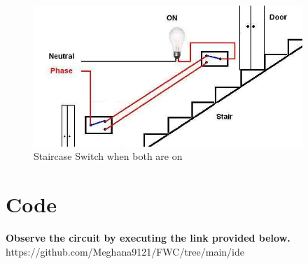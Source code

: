 \documentclass[journal,12pt,twocolumn]{IEEEtran}
\begin{document}
\begin{figure}
    \centering
    \includegraphics[width=4in]{Staircase.jpeg}
    \caption{Staircase Switch when both are on}
    \label{fig:circuit}
\end{figure}


\begin{table}[ht]
\centering
{}
\caption{Truth table}
\label{Truth table}
\end{table}
\section{Code}

\textbf{Observe the circuit by executing the link provided below.}\\

https://github.com/Meghana9121/FWC/tree/main/ide
\end{document}
